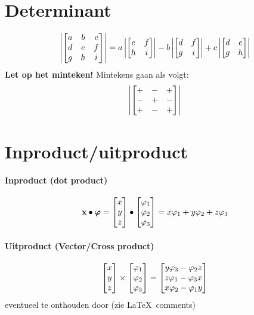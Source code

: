 \documentclass{article}
\begin{document}
    \section{Determinant}\label{sec:determinant}

    \[
        \det{
        a & b & c \\
        d & e & f \\
        g & h & i \\
        }
        = a \det{e & f \\ h & i} - b \det{d & f \\ g & i} + c \det{d & e \\ g & h}
    \]
    \textbf{Let op het minteken!} Mintekens gaan als volgt:
    \[
        \det{
        + & - & + \\
        - & + & - \\
        + & - & +
        }
    \]
    \section{Inproduct/uitproduct}\label{sec:inproduct/uitproduct}
    \paragraph{Inproduct (dot product)}
    \[ \x \bullet \bm \phi = \matrix{x \\ y \\ z} \bullet \matrix{\phi_1 \\ \phi_2 \\\phi_3} = x \phi_1 + y \phi_2 + z \phi_3 \]
    \paragraph{Uitproduct (Vector/Cross product)}
    \[ \matrix{x \\ y \\ z} \times \matrix{\phi_1 \\ \phi_2 \\\phi_3} = \matrix{y \phi_3 - \phi_2 z \\ z \phi_1 - \phi_3 x \\ x \phi_2 - \phi_1 y}  \]
    eventueel te onthouden door (zie \LaTeX\ comments)

\end{document}

